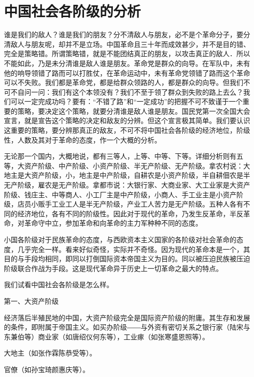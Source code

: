 \section[中国社会各阶级的分析（一九二六年）]{中国社会各阶级的分析}


谁是我们的敌人？谁是我们的朋友？分不清敌人与朋友，必不是个革命分子，要分清敌人与朋友呢，却并不是立场。中国革命且三十年而成效甚少，并不是目的错、完全是策略错。所谓策略错，就是不能团结真正的朋友，以攻击真正的敌人．所以不能如此，乃是未分清谁是敌人谁是朋友。革命党是群众的向导。在军队中，未有他的响导领错了路而可以打胜仗，在革命运动中，未有革命党领错了路而这个革命可以不失败。我们都是革命党，都是给群众领路的人，都是群众的向导。但我们不可不自问一问：我们有这个本领没有？我们不至于领了群众到失败的路上去么？我们可以一定完成功吗？要有：“不错了路”和“一定成功”的把握不可不致谨于一个重要的策略，要决定这个策略，就要分清谁是敌人谁是朋友。国民党第一次全国大会宣言，就是宣告这个策略的决定和敌友的分辨。但这个宣言极其简单。我们要认识这重要的策略，要分辨那真正的敌友，不可不将中国社会各阶级的经济地位，阶级性，人数及其对于革命的态度，作一个大概的分析。

无论那一个国内，大概地说，都有三等人，上等、中等、下等。详细分析则有五等，大资产阶级、中产阶级、小资产阶级、半无产阶级、无产阶级。拿农村说：大地主是大资产阶级，小，地主是中产阶级，自耕农是小资产阶级，半自耕佃农是半无产阶级，雇农是无产阶级。拿都市说：大银行家、大商业家、大工业家是大资产阶级、钱庄主、中等商人、小工厂主是中产阶级，小商人、手工业主是小资产阶级，店员小贩手工业工人是半无产阶级，产业工人苦力是无产阶级。五种人各有不同的经济地位，各有不同的阶级性。因此对于现代的革命，乃发生反革命，半反革命，对革命守中立，参加革命和向革命的主力军种种不同的态度。

小国各阶级对于民族革命的态度，与西欧资本主义国家的各阶级对社会革命的态度，几乎完全一样。看来好似奇怪，实际并不奇怪。因为现代的革命本是一个，其目的与手段均相同，即同以打倒国际资本帝国主义为目的。同以被压迫民族被压迫阶级联合作战为手段。这是现代革命异于历史上一切革命之最大的特点。

我们试看中国社会各阶级是怎么样。


第一、大资产阶级

经济落后半殖民地的中国，大资产阶级完全是国际资产阶级的附庸。其生存和发展的条件，即附属于帝国主义。如买办阶级――与外资有密切关系之银行家（陆宋与东兼伯等）商业家（如唐绍仪何东等），工业瘃（如张寒盛恩照等）。

大地主（如张作霖陈恭受等）。

官僚（如孙宝琦颜惠庆等）。


